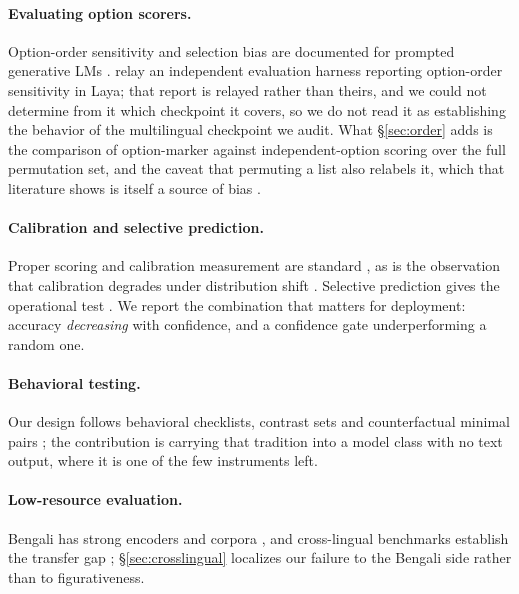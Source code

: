 \documentclass[11pt]{article}
\begin{document}
\paragraph{Evaluating option scorers.} Option-order sensitivity and selection
bias are documented for prompted generative LMs
\citep{pezeshkpour2024order,wei2024selection,zheng2024robust,zhao2021calibrate}.
\citet{sun2026typesafe} relay an independent evaluation harness reporting
option-order sensitivity in Laya; that report is relayed rather than theirs, and
we could not determine from it which checkpoint it covers, so we do not read it
as establishing the behavior of the multilingual checkpoint we audit. What \S\ref{sec:order} adds is the
comparison of option-marker against independent-option scoring over the full
permutation set, and the caveat that permuting a list also relabels it, which
that literature shows is itself a source of bias \citep{zheng2024robust}.

\paragraph{Calibration and selective prediction.} Proper scoring and calibration
measurement are standard
\citep{brier1950verification,gneiting2007proper,guo2017calibration,nixon2019measuring,kumar2019verified},
as is the observation that calibration degrades under distribution shift
\citep{ovadia2019trust,jiang2021know}. Selective prediction gives the operational
test \citep{geifman2017selective,geifman2019selectivenet,traub2024selective}. We
report the combination that matters for deployment: accuracy \emph{decreasing}
with confidence, and a confidence gate underperforming a random one.

\paragraph{Behavioral testing.} Our design follows behavioral checklists,
contrast sets and counterfactual minimal pairs
\citep{ribeiro2020checklist,gardner2020contrast,kaushik2020difference,naik2018stress,jia2017adversarial};
the contribution is carrying that tradition into a model class with no text
output, where it is one of the few instruments left.

\paragraph{Low-resource evaluation.} Bengali has strong encoders and corpora
\citep{bhattacharjee2022banglabert,kakwani2020indicnlpsuite}, and cross-lingual
benchmarks establish the transfer gap
\citep{hu2020xtreme,ruder2021xtremer,adelani2021masakhaner};
\S\ref{sec:crosslingual} localizes our failure to the Bengali side rather than to
figurativeness.
\end{document}
